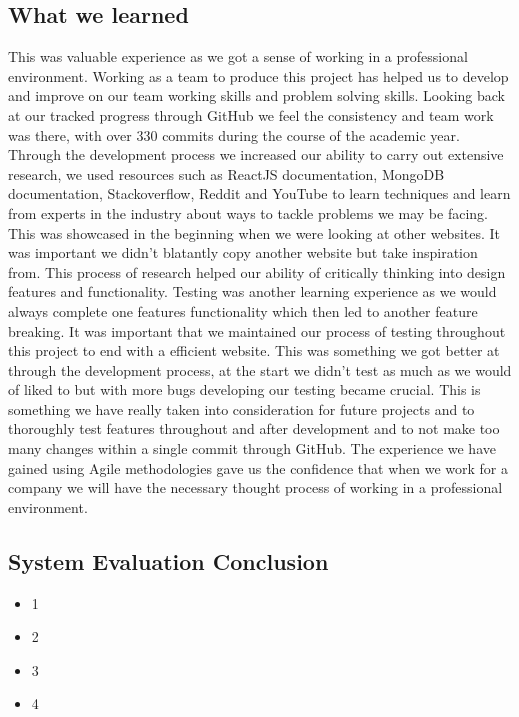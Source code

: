 \subsection{What we learned}
This was valuable experience as we got a sense of working in a professional environment. Working as a team to produce this project has helped us to develop and improve on our team working skills and problem solving skills. Looking back at our tracked progress through GitHub we feel the consistency and team work was there, with over 330 commits during the course of the academic year. Through the development process we increased our ability to carry out extensive research, we used resources such as ReactJS documentation, MongoDB documentation, Stackoverflow, Reddit and YouTube to learn techniques and learn from experts in the industry about ways to tackle problems we may be facing. This was showcased in the beginning when we were looking at other websites. It was important we didn't blatantly copy another website but take inspiration from. This process of research helped our ability of critically thinking into design features and functionality. 
Testing was another learning experience as we would always complete one features functionality which then led to another feature breaking. It was important that we maintained our process of testing throughout this project to end with a efficient website. This was something we got better at through the development process, at the start we didn't test as much as we would of liked to but with more bugs developing our testing became crucial. This is something we have really taken into consideration for future projects and to thoroughly test features throughout and after development and to not make too many changes within a single commit through GitHub.
The experience we have gained using Agile methodologies gave us the confidence that when we work for a company we will have the necessary thought process of working in a professional environment. 

\subsection{System Evaluation Conclusion}
\begin{itemize}
    \item 1
    \item 2
    \item 3
    \item 4
\end{itemize}

